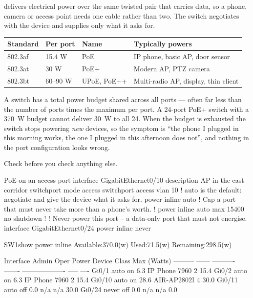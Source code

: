 \begin{definitionbox}[PoE]
 delivers electrical power over the same twisted pair
that carries data, so a phone, camera or access point needs one cable rather than
two. The switch negotiates with the device and supplies only what it asks for.
\end{definitionbox}

\begin{longtable}{@{}L{3.0cm}C{2.4cm}C{2.4cm}L{7.0cm}@{}}
\toprule
{}
\textbf{Standard} & \textbf{Per port} & \textbf{Name} & \textbf{Typically powers} \\
\midrule
\endhead
802.3af & 15.4 W & PoE & IP phone, basic AP, door sensor \\
802.3at & 30 W & PoE+ & Modern AP, PTZ camera \\
802.3bt & 60--90 W & UPoE, PoE++ & Multi-radio AP, display, thin client \\
\bottomrule
\end{longtable}

\begin{alertbox}
A switch has a total power budget shared across all ports --- often far less than
the number of ports times the maximum per port. A 24-port PoE+ switch with a
370~W budget cannot deliver 30~W to all 24. When the budget is exhausted the
switch stops powering \emph{new} devices, so the symptom is ``the phone I plugged
in this morning works, the one I plugged in this afternoon does not'', and
nothing in the port configuration looks wrong.

Check  before you check anything else.
\end{alertbox}

\begin{config}{PoE on an access port}
interface GigabitEthernet0/10
 description AP in the east corridor
 switchport mode access
 switchport access vlan 10
 ! auto is the default: negotiate and give the device what it asks for.
 power inline auto
 ! Cap a port that must never take more than a phone's worth.
 ! power inline auto max 15400
 no shutdown
!
! Never power this port -- a data-only port that must not energise.
interface GigabitEthernet0/24
 power inline never
\end{config}

\begin{verify}{SW1}{show power inline}
Available:370.0(w)  Used:71.5(w)  Remaining:298.5(w)

Interface Admin  Oper       Power   Device              Class Max
                            (Watts)
--------- ------ ---------- ------- ------------------- ----- ----
Gi0/1     auto   on         6.3     IP Phone 7960       2     15.4
Gi0/2     auto   on         6.3     IP Phone 7960       2     15.4
Gi0/10    auto   on         28.6    AIR-AP2802I         4     30.0
Gi0/11    auto   off        0.0     n/a                 n/a   30.0
Gi0/24    never  off        0.0     n/a                 n/a   0.0
\end{verify}

